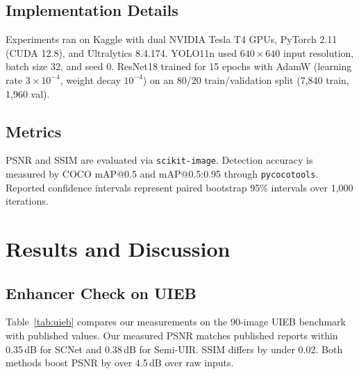 \documentclass[runningheads]{llncs}
\begin{document}
\subsection{Implementation Details}

Experiments ran on Kaggle with dual NVIDIA Tesla T4 GPUs, PyTorch 2.11 (CUDA 12.8), and Ultralytics 8.4.174. YOLO11n used $640 \times 640$ input resolution, batch size 32, and seed 0. ResNet18 trained for 15 epochs with AdamW (learning rate $3 \times 10^{-4}$, weight decay $10^{-4}$) on an 80/20 train/validation split (7{,}840 train, 1{,}960 val).

\subsection{Metrics}

PSNR and SSIM are evaluated via \texttt{scikit-image}. Detection accuracy is measured by COCO mAP@0.5 and mAP@0.5:0.95 through \texttt{pycocotools}. Reported confidence intervals represent paired bootstrap 95\% intervals over 1{,}000 iterations.

\section{Results and Discussion}
\label{sec:results}

\subsection{Enhancer Check on UIEB}
\label{sec:res-uieb}

Table~\ref{tab:uieb} compares our measurements on the 90-image UIEB benchmark with published values. Our measured PSNR matches published reports within 0.35\,dB for SCNet and 0.38\,dB for Semi-UIR. SSIM differs by under 0.02. Both methods boost PSNR by over 4.5\,dB over raw inputs.
\end{document}
